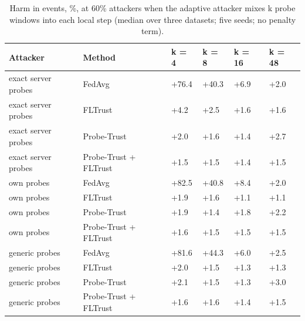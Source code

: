 \documentclass[journal]{IEEEtran}
\begin{document}
\begin{table}[!t]
\caption{Harm in events, \%, at 60\% attackers when the adaptive attacker mixes k probe windows into each local step (median over three datasets; five seeds; no penalty term).}
\centering
\footnotesize
\renewcommand{\arraystretch}{1.12}
\begin{tabular}{|>{\raggedright\arraybackslash}p{2.75cm}|>{\raggedright\arraybackslash}p{3.35cm}|>{\raggedright\arraybackslash}p{1.55cm}|>{\raggedright\arraybackslash}p{1.55cm}|>{\raggedright\arraybackslash}p{1.55cm}|>{\raggedright\arraybackslash}p{1.55cm}|}
\hline
\textbf{Attacker} & \textbf{Method} & \textbf{k = 4} & \textbf{k = 8} & \textbf{k = 16} & \textbf{k = 48} \\
\hline
exact server probes & FedAvg & +76.4 & +40.3 & +6.9 & +2.0 \\
\hline
exact server probes & FLTrust & +4.2 & +2.5 & +1.6 & +1.6 \\
\hline
exact server probes & Probe-Trust & +2.0 & +1.6 & +1.4 & +2.7 \\
\hline
exact server probes & Probe-Trust + FLTrust & +1.5 & +1.5 & +1.4 & +1.5 \\
\hline
own probes & FedAvg & +82.5 & +40.8 & +8.4 & +2.0 \\
\hline
own probes & FLTrust & +1.9 & +1.6 & +1.1 & +1.1 \\
\hline
own probes & Probe-Trust & +1.9 & +1.4 & +1.8 & +2.2 \\
\hline
own probes & Probe-Trust + FLTrust & +1.6 & +1.5 & +1.5 & +1.5 \\
\hline
generic probes & FedAvg & +81.6 & +44.3 & +6.0 & +2.5 \\
\hline
generic probes & FLTrust & +2.0 & +1.5 & +1.3 & +1.3 \\
\hline
generic probes & Probe-Trust & +2.1 & +1.5 & +1.3 & +3.0 \\
\hline
generic probes & Probe-Trust + FLTrust & +1.6 & +1.6 & +1.4 & +1.5 \\
\hline
\end{tabular}
\end{table}
\end{document}
